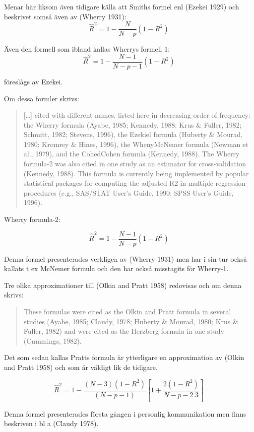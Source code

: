\documentclass[]{article}
\begin{document}
Menar här liksom även tidigare källa att Smiths formel enl (Ezekei 1929)
och beskrivet somså även av (Wherry 1931):
\[\hat{R}^2 = 1 - \frac{N}{N - p}(1 - R^2)\]

Även den formell som ibland kallas Wherrys formell 1:
\[\hat{R}^2 = 1 - \frac{N-1}{N - p-1}(1 - R^2)\]

föreslågs av Ezekei.

Om dessa formler skrivs:

\begin{quote}
{[}\ldots{}{]} cited with different names, listed here in decreasing
order of frequency: the Wherry formula (Ayabe, 1985; Kennedy, 1988; Krus
\& Fuller, 1982; Schmitt, 1982; Stevens, 1996), the Ezekiel formula
(Huberty \& Mourad, 1980; Kromrey \& Hines, 1996), the WhenyMcNemer
formula (Newman et al., 1979), and the CohedCohen formula (Kennedy,
1988). The Wherry formula-2 was also cited in one study as an estimator
for cross-validation (Kennedy, 1988). This formula is currently being
implemented by popular statistical packages for computing the adjusted
R2 in multiple regression procedures (e.g., SAS/STAT User's Guide, 1990;
SPSS User's Guide, 1996).
\end{quote}

Wherry formula-2:

\[\hat{R}^2 = 1 - \frac{N-1}{N-p}(1-R^2)\]

Denna formel presenterades verkligen av (Wherry 1931) men har i sin tur
också kallats t ex McNemer formula och den har också misstagits för
Wherry-1.

Tre olika approximationer till (Olkin and Pratt 1958) redovisas och om
denna skrivs:

\begin{quote}
These formulas were cited as the Olkin and Pratt formula in several
studies (Ayabe, 1985; Claudy, 1978; Huberty \& Mourad, 1980; Krus \&
Fuller, 1982) and were cited as the Herzberg formula in one study
(Cummings, 1982).
\end{quote}

Det som sedan kallas Pratts formula är ytterligare en approximation av
(Olkin and Pratt 1958) och som är väldigt lik de tidigare.

\[\hat{R}^2 = 1 - \frac{(N-3)(1-R^2)}{(N-p-1)}\left[1 + \frac{2(1-R^2)}{N-p-2.3}\right]\]

Denna formel presenterades första gången i personlig kommunikation men
finns beskriven i bl a (Claudy 1978).
\end{document}
